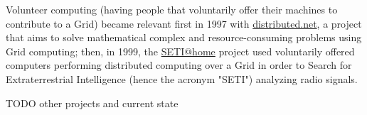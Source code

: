 Volunteer computing (having people that voluntarily offer their machines to contribute to a Grid) became relevant first in 1997 with \href{https://www.distributed.net/Main_Page}{distributed.net}, a project that aims to solve mathematical complex and resource-consuming problems using Grid computing; then, in 1999, the \href{https://setiathome.berkeley.edu/}{SETI@home} project used voluntarily offered computers performing distributed computing over a Grid in order to Search for Extraterrestrial Intelligence (hence the acronym "SETI") analyzing radio signals.

TODO other projects and current state